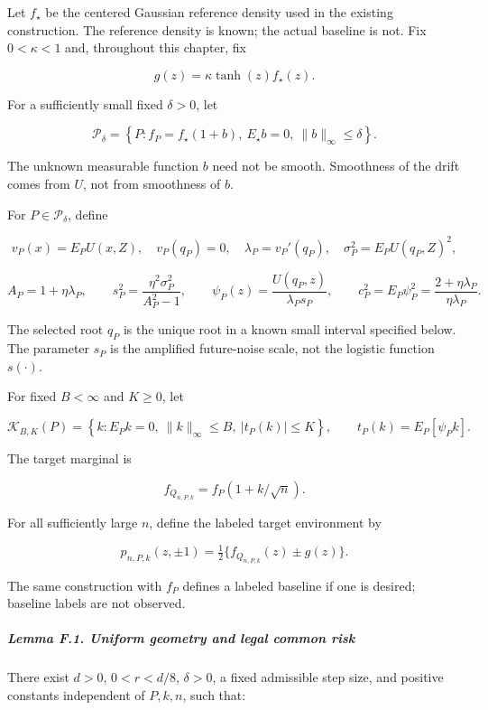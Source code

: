 Let \(f_\star\) be the centered Gaussian reference density used in the
existing construction. The reference density is known; the actual
baseline is not. Fix \(0<\kappa<1\) and, throughout this chapter, fix

\[
g(z)=\kappa\tanh(z)f_\star(z).
\]

For a sufficiently small fixed \(\delta>0\), let

\[
\mathcal P_\delta
=\left\{P:f_P=f_\star(1+b),\
 E_\star b=0,\ \|b\|_\infty\le\delta\right\}.
\tag{F.1}
\]

The unknown measurable function \(b\) need not be smooth. Smoothness of
the drift comes from \(U\), not from smoothness of \(b\).

For \(P\in\mathcal P_\delta\), define

\[
v_P(x)=E_PU(x,Z),\quad
v_P(q_P)=0,\quad
\lambda_P=v_P'(q_P),\quad
\sigma_P^2=E_PU(q_P,Z)^2,
\]

\[
A_P=1+\eta\lambda_P,\qquad
s_P^2=\frac{\eta^2\sigma_P^2}{A_P^2-1},\qquad
\psi_P(z)=\frac{U(q_P,z)}{\lambda_Ps_P},\qquad
c_P^2=E_P\psi_P^2
      =\frac{2+\eta\lambda_P}{\eta\lambda_P}.
\tag{F.2}
\]

The selected root \(q_P\) is the unique root in a known small interval
specified below. The parameter \(s_P\) is the amplified future-noise
scale, not the logistic function \(s(\cdot)\).

For fixed \(B<\infty\) and \(K\ge0\), let

\[
\mathcal K_{B,K}(P)
=\left\{k:E_Pk=0,\ \|k\|_\infty\le B,\
 |t_P(k)|\le K\right\},\qquad
t_P(k)=E_P[\psi_Pk].
\tag{F.3}
\]

The target marginal is

\[
f_{Q_{n,P,k}}=f_P(1+k/\sqrt n).
\tag{F.4}
\]

For all sufficiently large \(n\), define the labeled target environment
by

\[
p_{n,P,k}(z,\pm1)
=\tfrac12\{f_{Q_{n,P,k}}(z)\pm g(z)\}.
\tag{F.5}
\]

The same construction with \(f_P\) defines a labeled baseline if one is
desired; baseline labels are not observed.

\subparagraph{Lemma F.1. Uniform geometry and legal common
risk}\label{lemma-f.1.-uniform-geometry-and-legal-common-risk}

There exist \(d>0\), \(0<r<d/8\), \(\delta>0\), a fixed admissible step
size, and positive constants independent of \(P,k,n\), such that:

